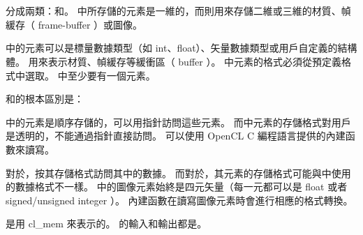 \startbuffer[sectitlememobj]
\stopbuffer
\section{\getbuffer[sectitlememobj]}
分成兩類：和。
中所存儲的元素是一維的，而則用來存儲二維或三維的材質、幀緩存（ frame-buffer ）或圖像。

中的元素可以是標量數據類型（如 int、float）、矢量數據類型或用戶自定義的結構體。
用來表示材質、幀緩存等緩衝區（ buffer ）。
中元素的格式必須從預定義格式中選取。
中至少要有一個元素。

和的根本區別是：
\startigBase
\item {}中的元素是順序存儲的，可以用指針訪問這些元素。
而中元素的存儲格式對用戶是透明的，不能通過指針直接訪問。
可以使用 OpenCL C 編程語言提供的內建函數來讀寫。

\item 對於，按其存儲格式訪問其中的數據。
而對於，其元素的存儲格式可能與中使用的數據格式不一樣。
中的圖像元素始終是四元矢量（每一元都可以是 float 或者 signed/unsigned integer ）。
內建函數在讀寫圖像元素時會進行相應的格式轉換。
\stopigBase

是用 {\ftEmp cl\_mem} 來表示的。
的輸入和輸出都是。

